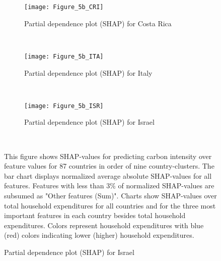 \begin{figure}[ht!]\ContinuedFloat
    \centering
   \begin{subfigure}[b]{\textwidth}
         \centering
         \caption{Partial dependence plot (SHAP) for Costa Rica}
         \label{fig:5b_CRI}
         \texttt{[image: Figure\_5b\_CRI]}         
     \end{subfigure}
    \\
    \vspace{0.5cm}
   \begin{subfigure}[b]{\textwidth}
         \centering
         \caption{Partial dependence plot (SHAP) for Italy}
         \label{fig:5b_ITA}
         \texttt{[image: Figure\_5b\_ITA]}         
     \end{subfigure}
    \\
    \vspace{0.5cm}
   \begin{subfigure}[b]{\textwidth}
         \centering
         \caption{Partial dependence plot (SHAP) for Israel}
         \label{fig:5b_ISR}
         \texttt{[image: Figure\_5b\_ISR]}
    \end{subfigure}
    \\
    \vspace{0.5cm}
    \begin{subcaption2}
     This figure shows SHAP-values for predicting carbon intensity over feature values for 87 countries in order of nine country-clusters. The bar chart displays normalized average absolute SHAP-values for all features. Features with less than 3\% of normalized SHAP-values are subsumed as "Other features (Sum)". Charts show SHAP-values over total household expenditures for all countries and for the three most important features in each country besides total household expenditures. Colors represent household expenditures with blue (red) colors indicating lower (higher) household expenditures.
     \end{subcaption2}
\end{figure}

